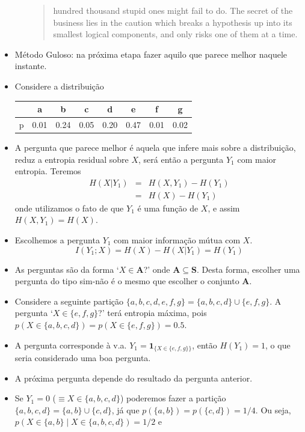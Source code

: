\begin{frame}[allowframebreaks]
\begin{itemize}
\begin{itemize}
\begin{quote}
		hundred thousand stupid ones might fail to do. The secret
		of the business lies in the caution which breaks a
		hypothesis up into its smallest logical components, and
		only risks one of them at a time.
		\end{quote}
	\end{itemize}
  \item Método Guloso: na próxima etapa fazer aquilo que parece melhor naquele instante. 
  \item Considere a distribuição
	\begin{tabular}{c|c|c|c|c|c|c|c}
		  & a    & b    & c    & d    & e    & f    & g \\ \hline
		p & 0.01 & 0.24 & 0.05 & 0.20 & 0.47 & 0.01 & 0.02
	\end{tabular}
  \item A pergunta que parece melhor é aquela que infere mais sobre a distribuição, reduz a entropia residual sobre $X$,
	será então a pergunta $Y_1$ com maior entropia. Teremos
	\begin{eqnarray}
	H(X|Y_1) &=& H(X,Y_1) - H(Y_1) \\
		 &=& H(X) - H(Y_1)
	\end{eqnarray}
	onde utilizamos o fato de que $Y_1$ é uma função de $X$, e assim $H(X,Y_1) = H(X)$.
  \item Escolhemos a pergunta $Y_1$ com maior informação mútua com $X$.
	\begin{equation}
	I(Y_1 ; X) = H(X) - H(X|Y_1) = H(Y_1)
	\end{equation}
  \item As perguntas são da forma `$X \in \mathbf{A}$?' onde $\mathbf{A} \subseteq \mathbf{S}$.
	Desta forma, escolher uma pergunta do tipo sim-não é o mesmo que escolher o conjunto $\mathbf{A}$.
  \item Considere a seguinte partição $\{a,b,c,d,e,f,g\} = \{a,b,c,d\} \cup \{e,f,g\}$. A pergunta
	`$X \in \{e,f,g\}$?' terá entropia máxima, pois $p(X \in \{a,b,c,d\}) = p(X \in \{e,f,g\}) = 0.5$.
  \item A pergunta corresponde à v.a. $Y_1 = \mathbf{1}_{\{X \in \{e,f,g\}\}}$, então
	$H(Y_1) = 1$, o que seria considerado uma boa pergunta.
  \item A próxima pergunta depende do resultado da pergunta anterior.
  \item Se $Y_1 = 0$ ($\equiv X \in \{a,b,c,d\}$) poderemos fazer a partição $\{a,b,c,d\} = \{a,b\} \cup \{c,d\}$,
	já que $p(\{a,b\}) = p(\{c,d\}) = 1/4$. Ou seja, $p(X \in \{a,b\} \mid X \in \{a,b,c,d\}) = 1/2$ e

\end{itemize}
\end{frame}
